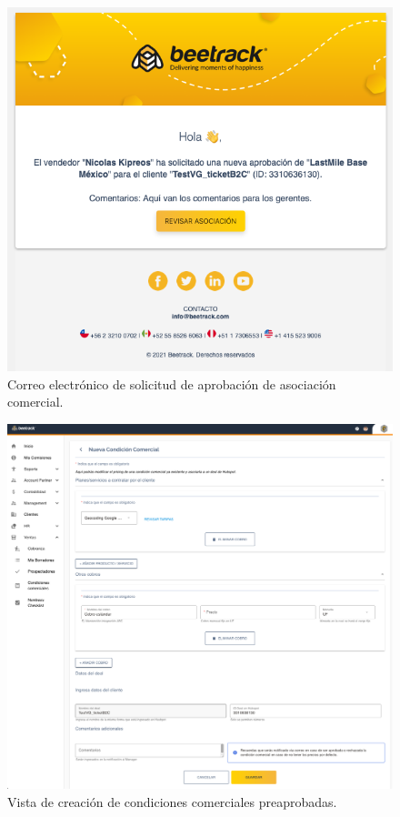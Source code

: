     \begin{figure}[H]
      \centering
      \includegraphics[width=0.8\linewidth]{figures/cc/mails/cc_mail_new.png}
      \caption{Correo electrónico de solicitud de aprobación de asociación comercial.}
      \label{fig:cc_mail_new}
    \end{figure}

    \begin{figure}[H]
      \centering
      \includegraphics[width=0.8\linewidth]{figures/cc/vistas/cc_new_sales_man.png}
      \caption{Vista de creación de condiciones comerciales preaprobadas.}
      \label{fig:cc_new_sales_man}
    \end{figure}

